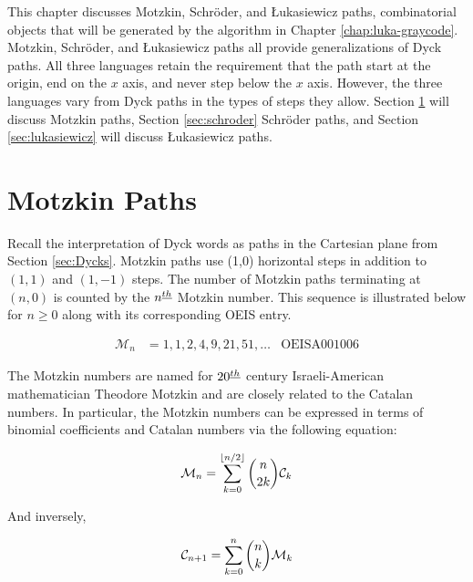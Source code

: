
This chapter discusses Motzkin, Schröder, and Łukasiewicz paths, combinatorial objects that will be generated by the algorithm in Chapter \ref{chap:luka-graycode}.
Motzkin, Schröder, and Łukasiewicz paths all provide generalizations of Dyck paths.  
All three languages retain the requirement that the path start at the origin, end on the $x$ axis, and never step below the $x$ axis.  However, the three languages vary from Dyck paths in the types of steps they allow.  Section \ref{sec:motzkin} will discuss Motzkin paths, Section \ref{sec:schroder} Schröder paths, and Section \ref{sec:lukasiewicz} will discuss Łukasiewicz paths.

\section{Motzkin Paths}\label{sec:motzkin}
Recall the interpretation of Dyck words as paths in the Cartesian plane from Section \ref{sec:Dycks}.
Motzkin paths use (1,0) horizontal steps in addition to $(1,1)$ and $(1,-1)$ steps. 
The number of Motzkin paths terminating at $(n,0)$ is counted by the $n^{\underline{th}}$ Motzkin number.  This sequence is illustrated below for $n \ge 0$ along with its corresponding OEIS entry.


\begin{align}
\mathcal{M}_n &= 1, 1, 2, 4, 9, 21, 51, \ldots  & \text{OEIS} \text{A}001006
\end{align}

The Motzkin numbers are named for $20^{\underline{th}}$ century Israeli-American mathematician Theodore Motzkin and are closely related to the Catalan numbers.  In particular, the Motzkin numbers can be expressed in terms of binomial coefficients and Catalan numbers via the following equation:

\begin{equation}
	\mathcal{M}_n = \sum_{k=0}^{\lfloor n/2 \rfloor} {n \choose 2k}\mathcal{C}_k
\end{equation}

And inversely, 

\begin{equation}
	\mathcal{C}_{n+1} = \sum_{k=0}^{n} {n \choose k}\mathcal{M}_k
\end{equation}

